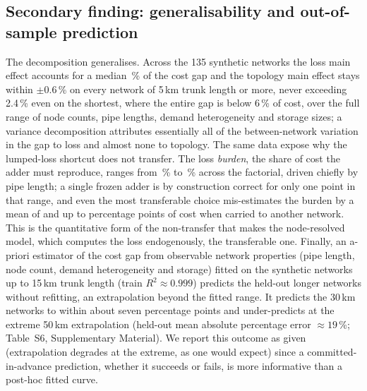 \documentclass[a4paper,fleqn]{cas-sc}
\begin{document}
\subsection{Secondary finding: generalisability and out-of-sample prediction}
\label{subsec:generalis}
The decomposition generalises. Across the 135 synthetic networks the loss main effect
accounts for a median \,\% of the cost gap and the topology main
effect stays within $\pm$0.6\,\% on every network of 5\,km trunk length or more, never exceeding 2.4\,\% even on the shortest, where the entire gap is below 6\,\% of cost, over the full range of
node counts, pipe lengths, demand heterogeneity and storage sizes; a variance decomposition
attributes essentially all of the between-network variation in the gap to loss and almost none
to topology. The same data expose why the lumped-loss shortcut does not transfer. The loss
\emph{burden}, the share of cost the adder must reproduce, ranges from
\,\% to \,\% across the factorial, driven
chiefly by pipe length; a single frozen adder is by construction correct for only one point in
that range, and even the most transferable choice mis-estimates the burden by a mean of
 and up to  percentage points of cost
when carried to another network. This is the quantitative form of the non-transfer that makes
the node-resolved model, which computes the loss endogenously, the transferable one. Finally,
an a-priori estimator of the cost gap from observable network properties (pipe length, node
count, demand heterogeneity and storage) fitted on the synthetic networks up to 15\,km trunk
length (train $R^2\approx0.999$) predicts the held-out longer networks without refitting, an
extrapolation beyond the fitted range. It predicts the 30\,km networks to within about seven
percentage points and under-predicts at the extreme 50\,km extrapolation (held-out mean absolute
percentage error $\approx19$\,\%; Table~S6, Supplementary Material). We report this outcome as given
(extrapolation degrades at the extreme, as one would expect) since a committed-in-advance
prediction, whether it succeeds or fails, is more informative than a post-hoc fitted curve.
\end{document}
